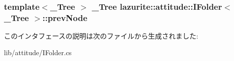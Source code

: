 \hypertarget{interfacelazurite_1_1attitude_1_1_i_folder_3_01___tree_01_4_a92c4da14156059798236dd8eeaec73e8}{
\subsubsection[{prevNode}]{\setlength{\rightskip}{0pt plus 5cm}template$<$\_\-Tree $>$ \_\-Tree lazurite::attitude::IFolder$<$ \_\-Tree $>$::prevNode}}
\label{interfacelazurite_1_1attitude_1_1_i_folder_3_01___tree_01_4_a92c4da14156059798236dd8eeaec73e8}


このインタフェースの説明は次のファイルから生成されました:\begin{DoxyCompactItemize}
\item 
lib/attitude/IFolder.cs\end{DoxyCompactItemize}
